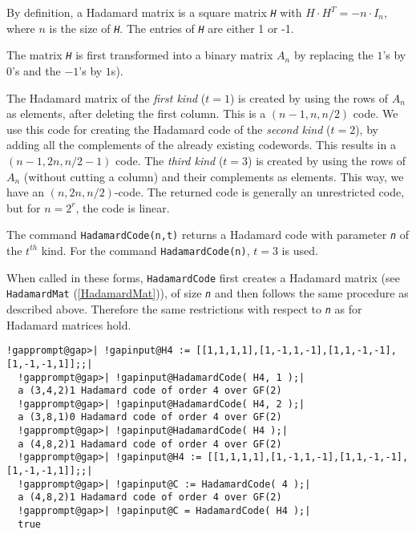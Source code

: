 \documentclass[a4paper,11pt]{report}
\begin{document}
{{{ By definition, a Hadamard matrix is a square matrix \mbox{\texttt{\mdseries\slshape H}} with $H\cdot H^T = -n\cdot I_n$, where $n$ is the size of \mbox{\texttt{\mdseries\slshape H}}. The entries of \mbox{\texttt{\mdseries\slshape H}} are either 1 or -1.  

 The matrix \mbox{\texttt{\mdseries\slshape H}} is first transformed into a binary matrix $A_n$ by replacing the $1$'s by $0$'s and the $-1$'s by $1$s). 

 The Hadamard matrix of the \emph{first kind} ($t=1$) is created by using the rows of $A_n$ as elements, after deleting the first column. This is a $(n-1, n, n/2)$ code. We use this code for creating the Hadamard code of the \emph{second kind} ($t=2$), by adding all the complements of the already existing codewords. This
results in a $(n-1, 2n, n/2 -1)$ code. The \emph{third kind} ($t=3$) is created by using the rows of $A_n$ (without cutting a column) and their complements as elements. This way, we
have an $(n, 2n, n/2)$-code. The returned code is generally an unrestricted code, but for $n = 2^r$, the code is linear. 

 The command \texttt{HadamardCode(n,t)} returns a Hadamard code with parameter \mbox{\texttt{\mdseries\slshape n}} of the $t^{th}$ kind. For the command \texttt{HadamardCode(n)}, $t=3$ is used. 

 When called in these forms, \texttt{HadamardCode} first creates a Hadamard matrix (see \texttt{HadamardMat} (\ref{HadamardMat})), of size \mbox{\texttt{\mdseries\slshape n}} and then follows the same procedure as described above. Therefore the same
restrictions with respect to \mbox{\texttt{\mdseries\slshape n}} as for Hadamard matrices hold. }

 
\begin{Verbatim}[commandchars=!@|,fontsize=\small,frame=single,label=Example]
  !gapprompt@gap>| !gapinput@H4 := [[1,1,1,1],[1,-1,1,-1],[1,1,-1,-1],[1,-1,-1,1]];;|
  !gapprompt@gap>| !gapinput@HadamardCode( H4, 1 );|
  a (3,4,2)1 Hadamard code of order 4 over GF(2)
  !gapprompt@gap>| !gapinput@HadamardCode( H4, 2 );|
  a (3,8,1)0 Hadamard code of order 4 over GF(2)
  !gapprompt@gap>| !gapinput@HadamardCode( H4 );|
  a (4,8,2)1 Hadamard code of order 4 over GF(2) 
  !gapprompt@gap>| !gapinput@H4 := [[1,1,1,1],[1,-1,1,-1],[1,1,-1,-1],[1,-1,-1,1]];;|
  !gapprompt@gap>| !gapinput@C := HadamardCode( 4 );|
  a (4,8,2)1 Hadamard code of order 4 over GF(2)
  !gapprompt@gap>| !gapinput@C = HadamardCode( H4 );|
  true 
\end{Verbatim}

}}
\end{document}

